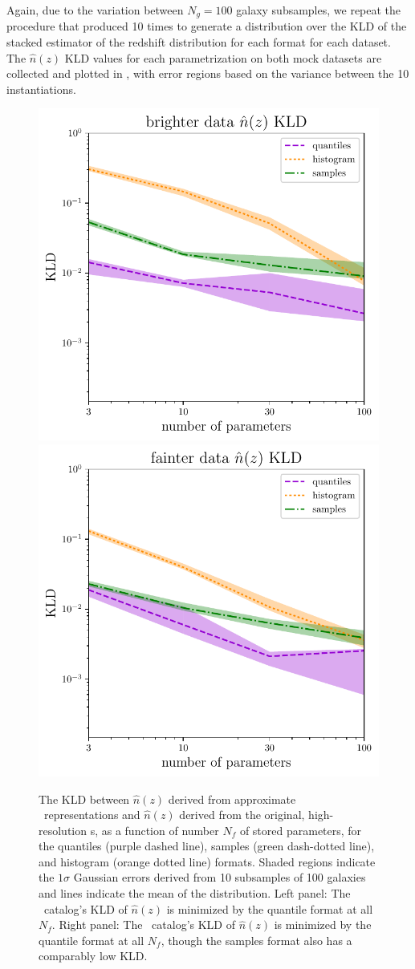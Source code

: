 Again, due to the variation between $N_{g}=100$ galaxy subsamples, we repeat 
the procedure that produced  10 times to generate a 
distribution over the KLD of the stacked estimator of the redshift distribution 
for each format for each dataset.
The $\hat{n}(z)$ KLD values for each parametrization on both mock datasets are 
collected and plotted in , with error regions based on the 
variance between the 10 instantiations.
\begin{figure}
	\begin{center}
		\includegraphics[width=0.5\columnwidth]{figures/qp/graham_nz_kld.pdf}    
		\includegraphics[width=0.5\columnwidth]{figures/qp/schmidt_nz_kld.pdf}
		\caption{The KLD between $\hat{n}(z)$ derived from approximate \pz\ 
			representations and $\hat{n}(z)$ derived from the original, high-resolution \pz 
			s, as a function of number $N_{f}$ of stored parameters, for the quantiles 
			(purple dashed line), samples (green dash-dotted line), and histogram (orange 
			dotted line) formats.
			Shaded regions indicate the $1\sigma$ Gaussian errors derived from 10 
			subsamples of 100 galaxies and lines indicate the mean of the distribution.
			Left panel: The \mgdata \pz\ catalog's KLD of $\hat{n}(z)$ is minimized by 
			the quantile format at all $N_{f}$.
			Right panel: The \ssdata \pz\ catalog's KLD of $\hat{n}(z)$ is minimized by 
			the quantile format at all $N_{f}$, though the samples format also has a 
			comparably low KLD.
			}
	\end{center}
\end{figure}
